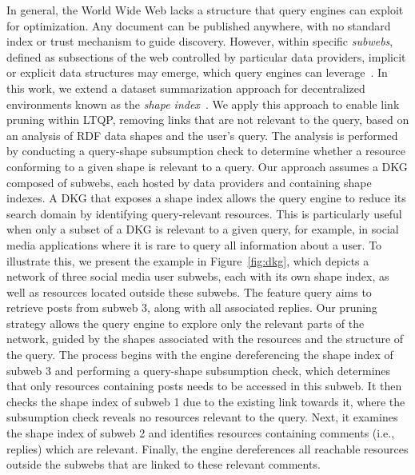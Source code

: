 In general, the World Wide Web lacks a structure that query engines can exploit for optimization.  
Any document can be published anywhere, with no standard index or trust mechanism to guide discovery.  
However, within specific \emph{subwebs}, defined as subsections of the web controlled by particular data providers, implicit or explicit data structures may emerge, which query engines can leverage~\cite{Bogaerts2021LinkTW}.
In this work, we extend a dataset summarization approach for decentralized environments known as the \emph{shape index}~\cite{tam2024opportunitiesshapebasedoptimizationlink}.
We apply this approach to enable link pruning within LTQP, removing links that are not relevant to the query, based on an analysis of RDF data shapes and the user's query.
The analysis is performed by conducting a query-shape subsumption check to determine whether a resource conforming to a given shape is relevant to a query.
Our approach assumes a DKG composed of subwebs, each hosted by data providers and containing shape indexes.
A DKG that exposes a shape index allows the query engine to reduce its search domain by identifying query-relevant resources.
This is particularly useful when only a subset of a DKG is relevant to a given query, for example, in social media applications where it is rare to query all information about a user.
To illustrate this, we present the example in Figure~\ref{fig:dkg}, which depicts a network of three social media user subwebs, each with its own shape index, as well as resources located outside these subwebs.
The feature query aims to retrieve posts from subweb 3, along with all associated replies.
Our pruning strategy allows the query engine to explore only the relevant parts of the network, guided by the shapes associated with the resources and the structure of the query.
The process begins with the engine dereferencing the shape index of subweb 3 and performing a query-shape subsumption check, which determines that only resources containing posts needs to be accessed in this subweb.  
It then checks the shape index of subweb 1 due to the existing link towards it, where the subsumption check reveals no resources relevant to the query.  
Next, it examines the shape index of subweb 2 and identifies resources containing comments (i.e., replies) which are relevant.  
Finally, the engine dereferences all reachable resources outside the subwebs that are linked to these relevant comments.

